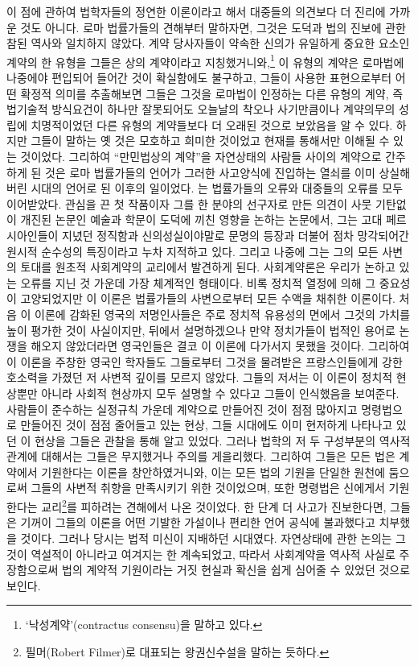 이 점에 관하여 법학자들의 정연한 이론이라고 해서 대중들의 의견보다 더
진리에 가까운 것도 아니다.
로마 법률가들의 견해부터 말하자면,
그것은 도덕과 법의 진보에 관한 참된 역사와 일치하지 않았다.
계약 당사자들이 약속한 신의가 유일하게 중요한 요소인
계약의 한 유형을 그들은 상의 계약이라고
지칭했거니와,\footnote{%
  `낙성계약'(contractus consensu)을 말하고 있다.
  }
이 유형의 계약은 로마법에 나중에야 편입되어 들어간 것이 확실함에도
불구하고,
그들이 사용한 표현으로부터 어떤 확정적 의미를 추출해보면
그들은 그것을 로마법이 인정하는 다른 유형의 계약, 즉
법기술적 방식요건이 하나만 잘못되어도 오늘날의 착오나 사기만큼이나
계약의무의 성립에 치명적이었던 다른 유형의 계약들보다
더 오래된 것으로 보았음을 알 수 있다.
하지만 그들이 말하는 옛 것은 모호하고 희미한 것이었고
현재를 통해서만 이해될 수 있는 것이었다.
그리하여 ``만민법상의 계약''을
자연상태의 사람들 사이의 계약으로 간주하게 된 것은
로마 법률가들의 언어가
그러한 사고양식에 진입하는 열쇠를 이미 상실해버린 시대의 언어로 된
이후의 일이었다.
는 법률가들의 오류와 대중들의 오류를 모두 이어받았다.
관심을 끈 첫 작품이자
그를 한 분야의 선구자로 만든 의견이 사뭇 기탄없이 개진된 논문인
예술과 학문이 도덕에 끼친 영향을 논하는 논문에서,
그는 고대 페르시아인들이 지녔던 정직함과 신의성실이야말로
문명의 등장과 더불어 점차 망각되어간 원시적 순수성의 특징이라고
누차 지적하고 있다.
그리고 나중에 그는
그의 모든 사변의 토대를
원초적 사회계약의 교리에서 발견하게 된다.
사회계약론은 우리가 논하고 있는 오류를 지닌 것 가운데 가장 체계적인 형태이다.
비록 정치적 열정에 의해 그 중요성이 고양되었지만
이 이론은 법률가들의 사변으로부터
모든 수액을 채취한 이론이다.
처음 이 이론에 감화된 영국의 저명인사들은
주로 정치적 유용성의 면에서 그것의 가치를 높이 평가한 것이 사실이지만,
뒤에서 설명하겠으나
만약 정치가들이 법적인 용어로 논쟁을 해오지 않았더라면
영국인들은 결코 이 이론에 다가서지 못했을 것이다.
그리하여 이 이론을 주창한 영국인 학자들도
그들로부터 그것을 물려받은 프랑스인들에게 강한 호소력을 가졌던
저 사변적 깊이를 모르지 않았다.
그들의 저서는 이 이론이 정치적 현상뿐만 아니라
사회적 현상까지 모두 설명할 수 있다고 그들이 인식했음을 보여준다.
사람들이 준수하는 실정규칙 가운데
계약으로 만들어진 것이 점점 많아지고
명령법으로 만들어진 것이 점점 줄어들고 있는 현상,
그들 시대에도 이미 현저하게 나타나고 있던 이 현상을
그들은 관찰을 통해 알고 있었다.
그러나 법학의 저 두 구성부분의 역사적 관계에 대해서는
그들은 무지했거나 주의를 게을리했다.
그리하여
그들은 모든 법은 계약에서 기원한다는 이론을 창안하였거니와, 이는
모든 법의 기원을 단일한 원천에 둠으로써 그들의 사변적 취향을
만족시키기 위한 것이었으며,
또한
명령법은 신에게서 기원한다는 교리\footnote{%
  필머(Robert Filmer)로 대표되는 왕권신수설을 말하는 듯하다.
}를 피하려는 견해에서 나온 것이었다.
한 단계 더 사고가 진보한다면,
그들은 기꺼이
그들의 이론을
어떤 기발한 가설이나 편리한 언어 공식에 불과했다고
치부했을 것이다.
그러나 당시는 법적 미신이 지배하던 시대였다.
자연상태에 관한 논의는 그것이 역설적이 아니라고 여겨지는 한 계속되었고,
따라서
사회계약을 역사적 사실로 주장함으로써
법의 계약적 기원이라는 거짓 현실과 확신을
쉽게 심어줄 수 있었던 것으로 보인다.

